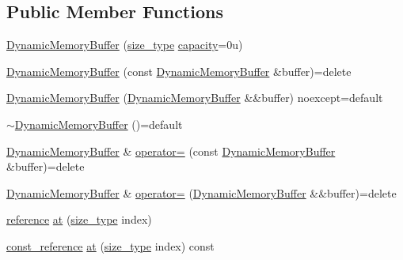 \subsection*{Public Member Functions}
\begin{DoxyCompactItemize}
\item 
\mbox{\hyperlink{classmage_1_1_dynamic_memory_buffer_a11e13ff173e7048ba05e2c576b9fa3b5}{Dynamic\+Memory\+Buffer}} (\mbox{\hyperlink{classmage_1_1_dynamic_memory_buffer_a45d02825da2b18fd7c24965ed5f46a30}{size\+\_\+type}} \mbox{\hyperlink{classmage_1_1_dynamic_memory_buffer_a58b0b92f2d7173b616bac7f5528a7aee}{capacity}}=0u)
\item 
\mbox{\hyperlink{classmage_1_1_dynamic_memory_buffer_adb6ade5258c5d27e553915b2e89e26be}{Dynamic\+Memory\+Buffer}} (const \mbox{\hyperlink{classmage_1_1_dynamic_memory_buffer}{Dynamic\+Memory\+Buffer}} \&buffer)=delete
\item 
\mbox{\hyperlink{classmage_1_1_dynamic_memory_buffer_a2492c04f3fe2562c20ac285723ad0512}{Dynamic\+Memory\+Buffer}} (\mbox{\hyperlink{classmage_1_1_dynamic_memory_buffer}{Dynamic\+Memory\+Buffer}} \&\&buffer) noexcept=default
\item 
\mbox{\hyperlink{classmage_1_1_dynamic_memory_buffer_a3bc8fafc04980ba739bffd0f28214830}{$\sim$\+Dynamic\+Memory\+Buffer}} ()=default
\item 
\mbox{\hyperlink{classmage_1_1_dynamic_memory_buffer}{Dynamic\+Memory\+Buffer}} \& \mbox{\hyperlink{classmage_1_1_dynamic_memory_buffer_afeaa37a7cdd398003c42ee12e8c4609d}{operator=}} (const \mbox{\hyperlink{classmage_1_1_dynamic_memory_buffer}{Dynamic\+Memory\+Buffer}} \&buffer)=delete
\item 
\mbox{\hyperlink{classmage_1_1_dynamic_memory_buffer}{Dynamic\+Memory\+Buffer}} \& \mbox{\hyperlink{classmage_1_1_dynamic_memory_buffer_ab915eb0797354d2a1cbab95b1b7c4500}{operator=}} (\mbox{\hyperlink{classmage_1_1_dynamic_memory_buffer}{Dynamic\+Memory\+Buffer}} \&\&buffer)=delete
\item 
\mbox{\hyperlink{classmage_1_1_dynamic_memory_buffer_a146681be5119c0329409436506334f05}{reference}} \mbox{\hyperlink{classmage_1_1_dynamic_memory_buffer_a1dcdbcbefe95ffa5c6472940411d5681}{at}} (\mbox{\hyperlink{classmage_1_1_dynamic_memory_buffer_a45d02825da2b18fd7c24965ed5f46a30}{size\+\_\+type}} index)
\item 
\mbox{\hyperlink{classmage_1_1_dynamic_memory_buffer_aa454489303e19392c54044d3b3ae67ad}{const\+\_\+reference}} \mbox{\hyperlink{classmage_1_1_dynamic_memory_buffer_a7ca5d05318bdc99d8f6df465bbdbd517}{at}} (\mbox{\hyperlink{classmage_1_1_dynamic_memory_buffer_a45d02825da2b18fd7c24965ed5f46a30}{size\+\_\+type}} index) const

\end{DoxyCompactItemize}
